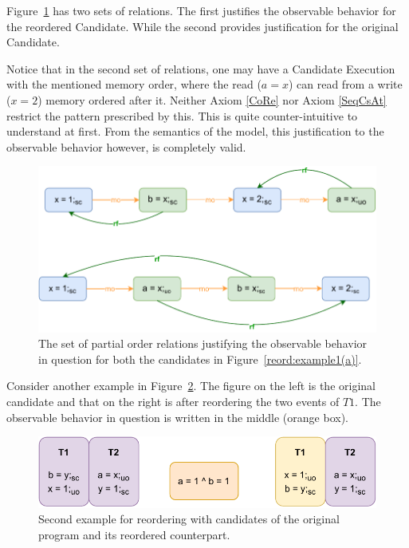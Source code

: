         Figure~\ref{reord:example1(b)} has two sets of relations. 
        The first justifies the observable behavior for the reordered Candidate. 
        While the second provides justification for the original Candidate. 
        
        Notice that in the second set of relations, one may have a Candidate Execution with the mentioned memory order, where the read ($a=x$) can read from a write ($x=2$) memory ordered after it. 
        Neither Axiom \ref{CoRe} nor Axiom \ref{SeqCsAt} restrict the pattern prescribed by this.
        This is quite counter-intuitive to understand at first. 
        From the semantics of the model, this justification to the observable behavior however, is completely valid\footnotemark. 
        \begin{figure}[H]
            \centering
            \includegraphics[scale=0.7]{4.InstructionReordering/0.Intro/ReorderingExample1(b).pdf}
            \caption{The set of partial order relations justifying the observable behavior in question for both the candidates in Figure~\ref{reord:example1(a)}.} 
            \label{reord:example1(b)}
        \end{figure}

        
        Consider another example in Figure~\ref{reord:example2(a)}.
        The figure on the left is the original candidate and that on the right is after reordering the two events of $T1$.
        The observable behavior in question is written in the middle (orange box). 
        \begin{figure}[H]
            \centering
            \includegraphics[scale=0.7]{4.InstructionReordering/0.Intro/ReorderingExample2(a).pdf}
            \caption{Second example for reordering with candidates of the original program and its reordered counterpart.} 
            \label{reord:example2(a)}
        \end{figure}
   
